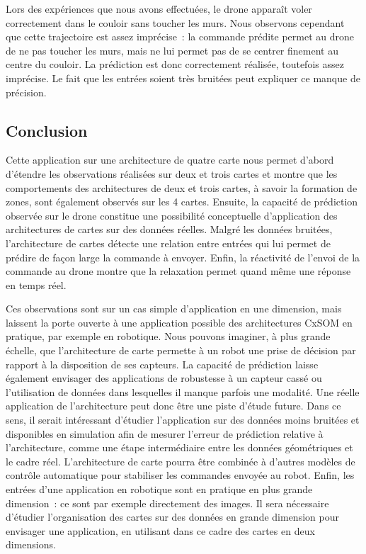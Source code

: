 \documentclass[../main]{subfiles}
\begin{document}
Lors des expériences que nous avons effectuées, le drone apparaît voler correctement dans le couloir sans toucher les murs. Nous observons cependant que cette trajectoire est assez imprécise~: la commande prédite permet au drone de ne pas toucher les murs, mais ne lui permet pas de se centrer finement au centre du couloir.
La prédiction est donc correctement réalisée, toutefois assez imprécise. 
Le fait que les entrées soient très bruitées peut expliquer ce manque de précision. 

\subsection{Conclusion}

Cette application sur une architecture de quatre carte nous permet d'abord d'étendre les observations réalisées sur deux et trois cartes et montre que les comportements des architectures de deux et trois cartes, à savoir la formation de zones, sont également observés sur les 4 cartes.
Ensuite, la capacité de prédiction observée sur le drone constitue une possibilité conceptuelle d'application des architectures de cartes sur des données réelles. 
Malgré les données bruitées, l'architecture de cartes détecte une relation entre entrées qui lui permet de prédire de façon large la commande à envoyer.
Enfin, la réactivité de l'envoi de la commande au drone montre que la relaxation permet quand même une réponse en temps réel.


Ces observations sont sur un cas simple d'application en une dimension, mais laissent la porte ouverte à une application possible des architectures CxSOM en pratique, par exemple en robotique. 
Nous pouvons imaginer, à plus grande échelle, que l'architecture de carte permette à un robot une prise de décision par rapport à la disposition de ses capteurs. La capacité de prédiction laisse également envisager des applications de robustesse à un capteur cassé ou l'utilisation de données dans lesquelles il manque parfois une modalité.
Une réelle application de l'architecture peut donc être une piste d'étude future.
Dans ce sens, il serait intéressant d'étudier l'application sur des données moins bruitées et disponibles en simulation afin de mesurer l'erreur de prédiction relative à l'architecture, comme une étape intermédiaire entre les données géométriques et le cadre réel. 
L'architecture de carte pourra être combinée à d'autres modèles de contrôle automatique pour stabiliser les commandes envoyée au robot.
Enfin, les entrées d'une application en robotique sont en pratique en plus grande dimension~: ce sont par exemple directement des images. Il sera nécessaire d'étudier l'organisation des cartes sur des données en grande dimension pour envisager une application, en utilisant dans ce cadre des cartes en deux dimensions.
\end{document}
